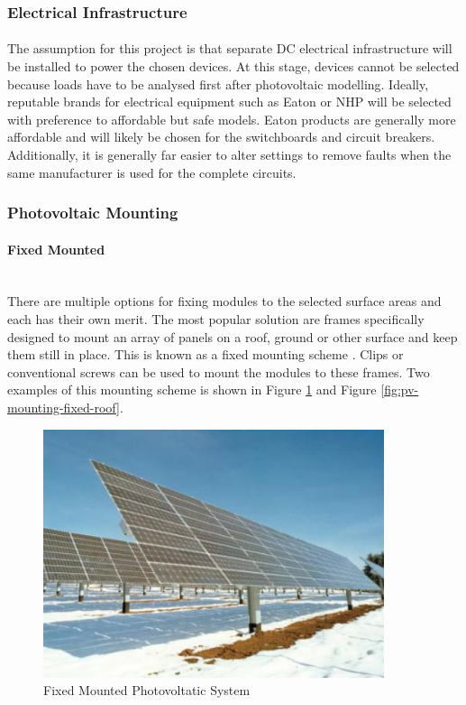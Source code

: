 \subsubsection{Electrical Infrastructure}

\paragraph{}
The assumption for this project is that separate DC electrical infrastructure will be installed to power the chosen devices. At this stage, devices cannot be selected because loads have to be analysed first after photovoltaic modelling. Ideally, reputable brands for electrical equipment such as Eaton or NHP will be selected with preference to affordable but safe models. Eaton products are generally more affordable and will likely be chosen for the switchboards and circuit breakers. Additionally, it is generally far easier to alter settings to remove faults when the same manufacturer is used for the complete circuits.  

\subsubsection{Photovoltaic Mounting} \label{section:photovoltatic-mounting}

\paragraph{Fixed Mounted} 
~\\
There are multiple options for fixing modules to the selected surface areas and each has their own merit. The most popular solution are frames specifically designed to mount an array of panels on a roof, ground or other surface and keep them still in place. This is known as a fixed mounting scheme \cite{Haberlin2012}. Clips or conventional screws can be used to mount the modules to these frames. Two examples of this mounting scheme is shown in Figure \ref{fig:pv-mounting-fixed-field} and Figure \ref{fig:pv-mounting-fixed-roof}. 

\begin{figure}[H]
	\hfill\includegraphics[width = 100mm]{images/pv-fixed-mounting}\hspace*{\fill}
	\caption{Fixed Mounted Photovoltatic System \cite{Haberlin2012}} 
	\label{fig:pv-mounting-fixed-field}
\end{figure}

